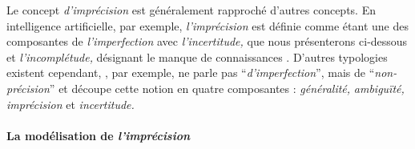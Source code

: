 

Le concept \emph{d'imprécision} est généralement rapproché d'autres
concepts. En intelligence artificielle, par exemple,
\emph{l'imprécision} est définie comme étant une des composantes de
\emph{l'imperfection} avec \emph{l'incertitude,} que nous présenterons
ci-dessous et \emph{l'incomplétude,} désignant le manque de
connaissances
\autocite{Bouchon-Meunier1995,Bouchon-Meunier2007}. D'autres
typologies existent cependant, \textcite{Niskanen1989}, par exemple,
ne parle pas \enquote{\emph{d'imperfection}}, mais de
\enquote{\emph{non-précision}} et découpe cette notion en quatre
composantes : \emph{généralité,} \emph{ambiguïté,} \emph{imprécision}
et \emph{incertitude.}

\paragraph{La modélisation de \emph{l'imprécision}}

